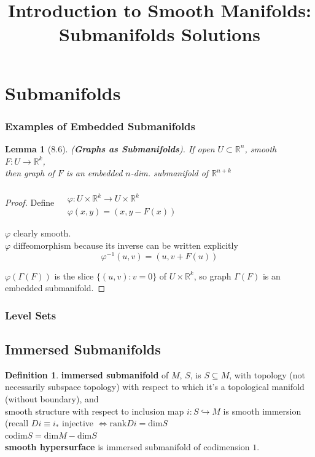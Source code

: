 \documentclass[11pt]{amsart}
\title{Introduction to Smooth Manifolds: Submanifolds Solutions}
\newtheorem{lemma}{Lemma}
\theoremstyle{definition}
\newtheorem{definition}{Definition}
\begin{document}
\maketitle
\section{Submanifolds}

\subsubsection*{Examples of Embedded Submanifolds }

\begin{lemma}[8.6] (\textbf{Graphs as Submanifolds}).
If open $U \subset \mathbb{R}^n$, smooth $F: U \to \mathbb{R}^k$, \\
then graph of $F$ is an embedded $n$-dim. submanifold of $\mathbb{R}^{n+k}$
\end{lemma}

\begin{proof}
  Define $\begin{aligned}
    & \quad \\
    & \varphi: U \times \mathbb{R}^k \to U \times \mathbb{R}^k \\
    & \varphi(x,y) = (x,y - F(x)) \end{aligned}$

$\varphi$ clearly smooth. \\
$\varphi$ diffeomorphism because its inverse can be written explicitly
\[
\varphi^{-1}(u,v) = (u ,  v + F(u))
\]

$\varphi( \Gamma(F))$ is the slice $\lbrace (u,v) : v = 0 \rbrace $ of $U\times \mathbb{R}^k$, so graph $\Gamma(F)$ is an embedded submanifold.



\end{proof}



\subsubsection*{Level Sets}


\subsection*{Immersed Submanifolds}

\begin{definition}
  \textbf{immersed submanifold } of $M$, $S$, is $S\subseteq M$, with topology (not necessarily subspace topology) with respect to which it's a topological manifold (without boundary), and \\
\phantom{ \quad \quad \, }   smooth structure with respect to inclusion map $i : S \hookrightarrow M$ is smooth immersion (recall $Di \equiv i_*$ injective $\Longleftrightarrow \text{rank}Di = \text{dim}S$ \\

$\text{codim}S = \text{dim}M - \text{dim}S$ \\

\textbf{smooth hypersurface} is immersed submanifold of codimension $1$.
\end{definition}
\end{document}
